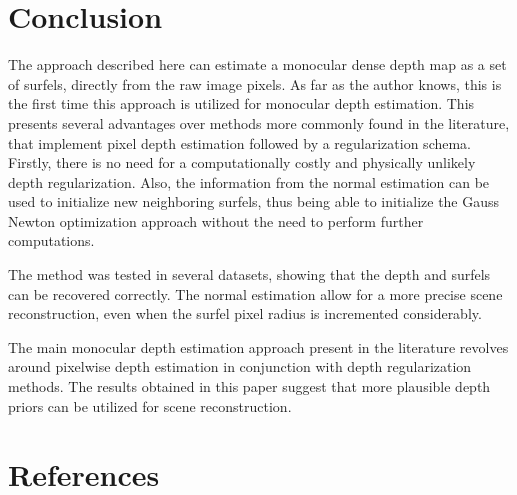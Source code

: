 \documentclass[1p]{elsarticle}
\begin{document}
\section{Conclusion}

The approach described here can estimate a monocular dense depth map as a set of surfels, directly from the raw image pixels. As far as the author knows, this is the first time this approach is utilized for monocular depth estimation. This presents several advantages over methods more commonly found in the literature, that implement pixel depth estimation followed by a regularization schema. Firstly, there is no need for a computationally costly and physically unlikely depth regularization. Also, the information from the normal estimation can be used to initialize new neighboring surfels, thus being able to initialize the Gauss Newton optimization approach without the need to perform further computations. 

The method was tested in several datasets, showing that the depth and surfels can be recovered correctly. The normal estimation allow for a more precise scene reconstruction, even when the surfel pixel radius is incremented considerably.

The main monocular depth estimation approach present in the literature revolves around pixelwise depth estimation in conjunction with depth regularization methods. The results obtained in this paper suggest that more plausible depth priors can be utilized for scene reconstruction.

\section*{References}


\end{document}
